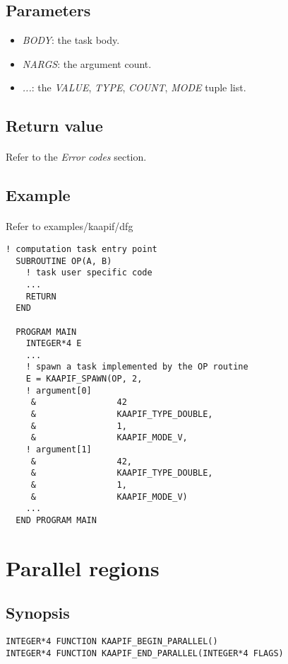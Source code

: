 \documentclass[a4paper, 11pt]{article}
\begin{document}
\subsection{Parameters}
\begin{itemize}
\item \textit{BODY}: the task body.
\item \textit{NARGS}: the argument count.
\item \textit{...}: the \textit{VALUE}, \textit{TYPE}, \textit{COUNT}, \textit{MODE} tuple list.
\end{itemize}

\subsection{Return value}
\paragraph{}
Refer to the \textit{Error codes} section.

\subsection{Example}
\paragraph{}
Refer to examples/kaapif/dfg

\begin{small}
\begin{lstlisting}[frame=tb]
  ! computation task entry point
  SUBROUTINE OP(A, B)
    ! task user specific code
    ...
    RETURN
  END

  PROGRAM MAIN
    INTEGER*4 E
    ...
    ! spawn a task implemented by the OP routine
    E = KAAPIF_SPAWN(OP, 2,
    ! argument[0]
     &                42
     &                KAAPIF_TYPE_DOUBLE,
     &                1,
     &                KAAPIF_MODE_V,
    ! argument[1]
     &                42,
     &                KAAPIF_TYPE_DOUBLE,
     &                1,
     &                KAAPIF_MODE_V)
    ...
  END PROGRAM MAIN
\end{lstlisting}
\end{small}


\newpage
\section{Parallel regions}

\subsection{Synopsis}
\begin{small}
\lstset{language=C}
\begin{lstlisting}[frame=tb]
INTEGER*4 FUNCTION KAAPIF_BEGIN_PARALLEL()
INTEGER*4 FUNCTION KAAPIF_END_PARALLEL(INTEGER*4 FLAGS)
\end{lstlisting}
\end{small}
\end{document}
